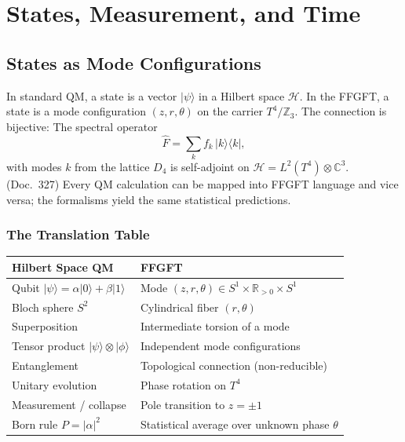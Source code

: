 \chapter{States, Measurement, and Time}
\label{ch:zustand}

\section{States as Mode Configurations}

In standard QM, a state is a vector $|\psi\rangle$ in a
Hilbert space $\mathcal{H}$. In the FFGFT, a state is a
mode configuration $(z, r, \theta)$ on the carrier $T^4/\mathbb{Z}_3$.
The connection is bijective: The spectral operator
\begin{equation}
  \hat F = \sum_k f_k\, |k\rangle\langle k|,
  \label{eq:spektral}
\end{equation}
with modes $k$ from the lattice $D_4$ is self-adjoint on
$\mathcal{H} = L^2(T^4)\otimes\mathbb{C}^3$. (Doc.~327)
Every QM calculation can be mapped into FFGFT language and vice versa;
the formalisms yield the same statistical predictions.

\subsection{The Translation Table}

\begin{center}
\small\renewcommand{\arraystretch}{1.25}
\begin{tabular}{p{3.4cm}p{4.2cm}}
\toprule
Hilbert Space QM & FFGFT \\
\midrule
Qubit $|\psi\rangle = \alpha|0\rangle+\beta|1\rangle$ & Mode $(z,r,\theta)\in S^1\times\mathbb{R}_{>0}\times S^1$ \\
Bloch sphere $S^2$ & Cylindrical fiber $(r,\theta)$ \\
Superposition & Intermediate torsion of a mode \\
Tensor product $|\psi\rangle\otimes|\phi\rangle$ & Independent mode configurations \\
Entanglement & Topological connection (non-reducible) \\
Unitary evolution & Phase rotation on $T^4$ \\
Measurement / collapse & Pole transition to $z=\pm1$ \\
Born rule $P=|\alpha|^2$ & Statistical average over unknown phase $\theta$ \\
\bottomrule
\end{tabular}
\end{center}

